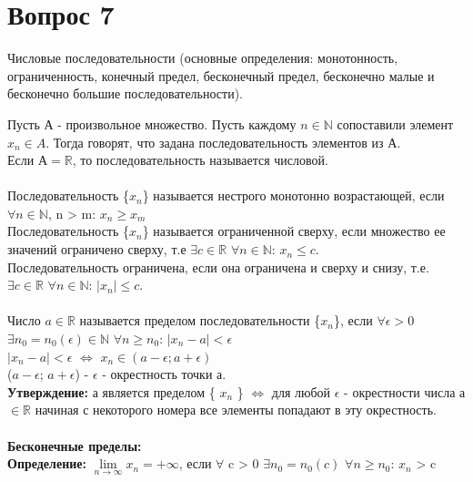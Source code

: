 \documentclass{article}
\DeclareMathOperator{\Exists}{\exists}
\DeclareMathOperator{\Forall}{\forall}
\begin{document}
\section*{Вопрос 7}
 
\begin{center}
   {Числовые последовательности (основные определения: монотонность, ограниченность, конечный предел, бесконечный предел, бесконечно малые и бесконечно большие последовательности).} \\
\end{center}
 
   Пусть А - произвольное множество. Пусть каждому $n \in \mathbb{N}$ сопоставили элемент $x_n \in A$. Тогда говорят, что задана последовательность элементов из А. \\
   Если $А = \mathbb{R}$, то последовательность называется числовой.\\
   \\
   Последовательность \{$x_n$\} называется нестрого монотонно возрастающей, если $\Forall n \in \mathbb{N}$, n > m: $x_n \geq x_m$ \\
   Последовательность \{$x_n$\} называется ограниченной сверху, если множество ее значений ограничено сверху, т.е $\Exists c \in \mathbb{R}$ $\Forall n \in \mathbb{N}$: $x_n \leq c$. \\
   Последовательность ограничена, если она ограничена и сверху и снизу, т.е. $\Exists c \in \mathbb{R}$ $\Forall n \in \mathbb{N}$: $|x_n| \leq c$. \\
   \\
   Число $a \in \mathbb{R}$ называется пределом последовательности \{$x_n$\}, если $\Forall \epsilon >0$ $\Exists n_0 = n_0(\epsilon) \in \mathbb{N}$ $\Forall n \geq n_0$: $|x_n - a| < \epsilon$ \\
   $|x_n - a| < \epsilon$ $\Longleftrightarrow$ $ x_n \in (a - \epsilon; a + \epsilon)$ \\
   ($a - \epsilon$; $a + \epsilon$) - $\epsilon$ - окрестность точки а. \\
   \textbf{Утверждение: }
   а является пределом \{ $x_n$ \} $\Longleftrightarrow$ для любой $\epsilon$ - окрестности числа а $\in \mathbb{R}$ начиная с некоторого номера все элементы попадают в эту окрестность. \\
   \\
   \textbf{Бесконечные пределы: }\\
   \textbf{Определение: }
   $\lim\limits_{n \to \infty} {x_n} = + \infty$, если $\Forall$ c > 0 $ \Exists n_0 = n_0 (c)$ $\Forall n \geq n_0$:  $x_n$ > c \\
\end{document}
